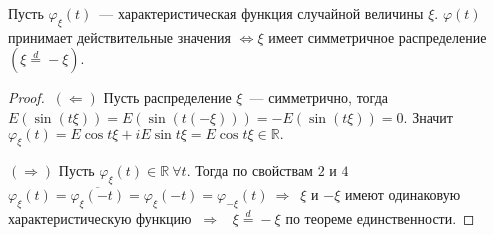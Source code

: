 	\begin{property}
		Пусть $\varphi_\xi(t)$~--- характеристическая функция случайной величины $\xi$. $\varphi(t)$ принимает действительные значения $\Leftrightarrow \xi$ имеет симметричное распределение $(\xi \overset{d}{=} -\xi)$.
		\begin{proof}
			$~(\Leftarrow)$ Пусть распределение $\xi$~--- симметрично, тогда $E(\sin(t\xi)) = E(\sin(t(-\xi))) = -E(\sin(t\xi)) = 0.$ Значит $\varphi_\xi(t) = E\cos t\xi + iE\sin t\xi = E\cos t\xi \in \mathbb{R}.$

			$(\Rightarrow)$ Пусть $\varphi_\xi(t) \in \mathbb{R} ~\forall t.$ Тогда по свойствам $2$ и $4$ $\varphi_\xi(t) = \overline{\varphi_\xi(-t)} = \varphi_\xi(-t) = \varphi_{-\xi}(t) ~\Rightarrow $~$\xi$ и $-\xi$ имеют одинаковую характеристическую функцию $~\Rightarrow$~ $\xi \overset{d}{=} -\xi$ по теореме единственности.
		\end{proof}
	\end{property}

